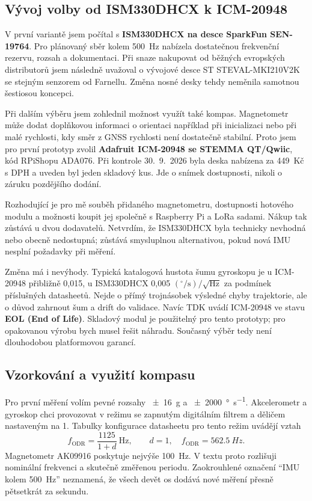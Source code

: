 \subsection{Vývoj volby od ISM330DHCX k ICM-20948}

V první variantě jsem počítal s \textbf{ISM330DHCX na desce SparkFun
SEN-19764}. Pro plánovaný sběr kolem \SI{500}{Hz} nabízela dostatečnou
frekvenční rezervu, rozsah a dokumentaci. Při snaze nakupovat od běžných
evropských distributorů jsem následně uvažoval o vývojové desce ST
STEVAL-MKI210V2K se stejným senzorem od Farnellu. Změna nosné desky tehdy
neměnila samotnou šestiosou koncepci.\cite{sparkfun-ism330dhcx,farnell-ism330dhcx}

Při dalším výběru jsem zohlednil možnost využít také kompas. Magnetometr může
dodat doplňkovou informaci o orientaci například při inicializaci nebo při
malé rychlosti, kdy směr z GNSS rychlosti není dostatečně stabilní. Proto
jsem pro první prototyp zvolil \textbf{Adafruit ICM-20948 se STEMMA QT/Qwiic},
kód RPiShopu ADA076. Při kontrole 30.~9.~2026 byla deska nabízena za
449~Kč s DPH a uveden byl jeden skladový kus. Jde o snímek dostupnosti,
nikoli o záruku pozdějšího dodání.\cite{rpishop-icm20948}

Rozhodující je pro mě souběh přidaného magnetometru, dostupnosti hotového
modulu a možnosti koupit jej společně s Raspberry Pi a LoRa sadami. Nákup
tak zůstává u dvou dodavatelů. Netvrdím, že ISM330DHCX byla technicky
nevhodná nebo obecně nedostupná; zůstává smysluplnou alternativou, pokud
nová IMU nesplní požadavky při měření.

Změna má i nevýhody. Typická katalogová hustota šumu gyroskopu je u
ICM-20948 přibližně 0,015, u ISM330DHCX 0,005
$(^{\circ}/\mathrm{s})/\sqrt{\mathrm{Hz}}$ za podmínek příslušných
datasheetů.\cite{tdk-icm20948,st-ism330dhcx-ds}
Nejde o přímý trojnásobek výsledné chyby trajektorie, ale o důvod zahrnout
šum a drift do validace. Navíc TDK uvádí ICM-20948 ve stavu
\textbf{EOL (End of Life)}.\cite{tdk-icm20948-status}
Skladový modul je použitelný pro tento prototyp; pro opakovanou výrobu bych
musel řešit náhradu. Současný výběr tedy není dlouhodobou platformovou
garancí.

\subsection{Vzorkování a využití kompasu}

Pro první měření volím pevné rozsahy \SI{\pm16}{g} a
\SI{\pm2000}{\degree\per\second}. Akcelerometr a gyroskop chci provozovat
v režimu se zapnutým digitálním filtrem a děličem nastaveným na 1.
Tabulky konfigurace datasheetu pro tento režim uvádějí vztah
\begin{equation}
  f_\mathrm{ODR}=\frac{1125}{1+d}\ \mathrm{Hz},
  \qquad d=1,\quad f_\mathrm{ODR}=\SI{562.5}{Hz}.
\end{equation}
Magnetometr AK09916 poskytuje nejvýše \SI{100}{Hz}.
\cite{tdk-icm20948,adafruit-icm20948}
V textu proto rozlišuji nominální frekvenci a skutečně změřenou periodu.
Zaokrouhlené označení \enquote{IMU kolem 500~Hz} neznamená, že všech devět
os dodává nové měření přesně pětsetkrát za sekundu.

